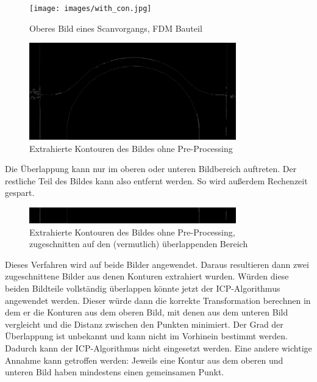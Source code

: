 \begin{figure}[h]
    \centering
    \texttt{[image: images/with\_con.jpg]} %
    \caption{Oberes Bild eines Scanvorgangs, FDM Bauteil}
    \label{fig:image_top}
\end{figure}

\begin{figure}[h]
    \centering
    \includegraphics[width=0.8\textwidth]{images/only_con.jpg} %
    \caption{Extrahierte Kontouren des Bildes ohne Pre-Processing}
    \label{fig:cons}
\end{figure}

Die Überlappung kann nur im oberen oder unteren Bildbereich auftreten. Der restliche 
Teil des Bildes kann also entfernt werden. So wird außerdem Rechenzeit gespart.

\begin{figure}[h]
    \centering
    \includegraphics[width=0.8\textwidth]{images/only_con_cut.jpg} %
    \caption{Extrahierte Kontouren des Bildes ohne Pre-Processing, zugeschnitten 
    auf den (vermutlich) überlappenden Bereich}
    \label{fig:cons_cut}
\end{figure}

Dieses Verfahren wird auf beide Bilder angewendet. Daraus resultieren dann zwei 
zugeschnittene Bilder aus denen Konturen extrahiert wurden. 
Würden diese beiden Bildteile vollständig überlappen könnte jetzt der ICP-Algorithmus
angewendet werden. Dieser würde dann die korrekte Transformation berechnen in dem er 
die Konturen aus dem oberen Bild, mit denen aus dem unteren Bild vergleicht und die 
Distanz zwischen den Punkten minimiert. 
Der Grad der Überlappung ist unbekannt und kann nicht im Vorhinein bestimmt werden.
Dadurch kann der ICP-Algorithmus nicht eingesetzt werden. 
Eine andere wichtige Annahme kann getroffen werden: Jeweils eine Kontur aus 
dem oberen und unteren Bild haben mindestens einen gemeinsamen Punkt.

